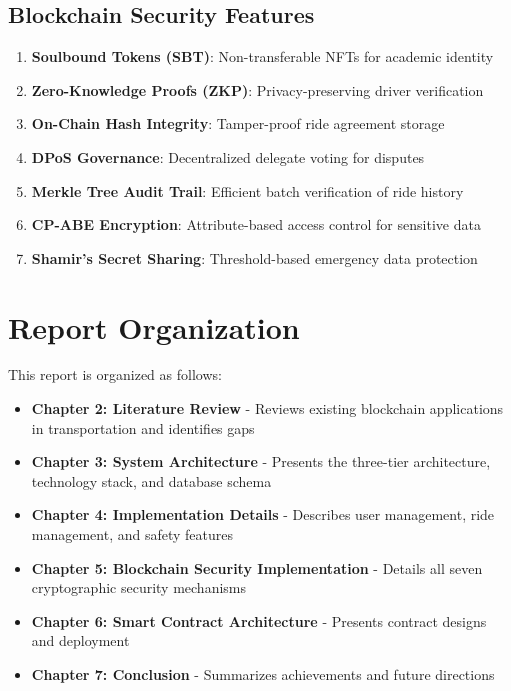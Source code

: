 \subsection{Blockchain Security Features}

\begin{enumerate}
    \item \textbf{Soulbound Tokens (SBT)}: Non-transferable NFTs for academic identity
    \item \textbf{Zero-Knowledge Proofs (ZKP)}: Privacy-preserving driver verification
    \item \textbf{On-Chain Hash Integrity}: Tamper-proof ride agreement storage
    \item \textbf{DPoS Governance}: Decentralized delegate voting for disputes
    \item \textbf{Merkle Tree Audit Trail}: Efficient batch verification of ride history
    \item \textbf{CP-ABE Encryption}: Attribute-based access control for sensitive data
    \item \textbf{Shamir's Secret Sharing}: Threshold-based emergency data protection
\end{enumerate}

\section{Report Organization}

This report is organized as follows:

\begin{itemize}
    \item \textbf{Chapter 2: Literature Review} - Reviews existing blockchain applications in transportation and identifies gaps
    \item \textbf{Chapter 3: System Architecture} - Presents the three-tier architecture, technology stack, and database schema
    \item \textbf{Chapter 4: Implementation Details} - Describes user management, ride management, and safety features
    \item \textbf{Chapter 5: Blockchain Security Implementation} - Details all seven cryptographic security mechanisms
    \item \textbf{Chapter 6: Smart Contract Architecture} - Presents contract designs and deployment
    \item \textbf{Chapter 7: Conclusion} - Summarizes achievements and future directions
\end{itemize}

